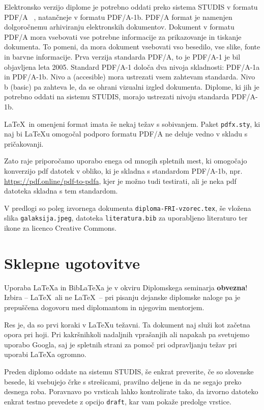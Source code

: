 \documentclass[a4paper,12pt,openright]{book}
\newcommand{\BibLaTeX}{{\sc Bib}\LaTeX}
\begin{document}
Elektronsko verzijo diplome je potrebno oddati preko sistema STUDIS v formatu PDF/A ~\cite{howtopdfa,pdfa},
natančneje v formatu PDF/A-1b. 
PDF/A format je namenjen dolgoročnemu arhiviranju elektronskih dokumentov.
Dokument v formatu PDF/A mora vsebovati vse potrebne informacije za prikazovanje in tiskanje dokumenta. To pomeni, da mora dokument  vsebovati vso besedilo, vse slike, fonte in barvne informacije.
Prva verzija standarda PDF/A, to je PDF/A-1 je bil objavljena leta 2005.
Standard PDF/A-1 določa dva nivoja skladnosti: PDF/A-1a in PDF/A-1b.
Nivo a (accesible) mora ustrezati vsem zahtevam standarda.
Nivo b (basic) pa zahteva le, da se ohrani vizualni izgled dokumenta.
Diplome, ki jih je potrebno oddati na sistemu STUDIS, morajo ustrezati nivoju standarda 
PDF/A-1b.

\LaTeX\ in omenjeni format imata še nekaj težav s sobivanjem. 
Paket \texttt{pdfx.sty}, ki naj bi \LaTeX{u} omogočal podporo formatu PDF/A ne deluje vedno
v skladu s pričakovanji. 

Zato raje priporočamo uporabo enega od mnogih spletnih mest, ki omo\-go\-ča\-jo konverzijo pdf datotek v obliko,
ki je skladna s standardom PDF/A-1b, npr. \url{https://pdf.online/pdf-to-pdfa}, kjer je
možno tudi testirati, ali je neka pdf datoteka skladna s tem standardom.

V predlogi so poleg izvornega  dokumenta \texttt{diploma-FRI-vzorec.tex}, še vložena slika \texttt{galaksija.jpeg}, datoteka \texttt{literatura.bib} za uporabljeno literaturo  ter
ikone za licenco Creative Commons.


\chapter{Sklepne ugotovitve}

Uporaba \LaTeX{a} in \BibLaTeX{a} je v okviru Diplomskega seminarja \textbf{obvezna}!
Izbira -- \LaTeX\ ali ne \LaTeX\ -- pri pisanju dejanske diplomske naloge pa je pre\-pu\-šče\-na dogovoru med diplomantom in njegovim mentorjem.

Res je, da so prvi koraki v \LaTeX{}u težavni. 
Ta dokument naj služi kot začetna opora pri hoji.
Pri kakršnihkoli nadaljnih vprašanjih ali napakah pa svetujemo uporabo Googla, saj je spletnih strani za pomoč pri odpravljanju težav pri uporabi \LaTeX{}a ogromno.

Preden diplomo oddate na sistemu STUDIS, še enkrat preverite, če so slovenske besede, ki vsebujejo črke s strešicami,  pravilno deljene in da ne segajo preko desnega roba.
Poravnavo po vrsticah lahko kontrolirate tako, da izvorno datoteko enkrat testno prevedete z opcijo \texttt{draft}, kar vam pokaže  predolge vrstice.






\printbibliography[heading=bibintoc,type=article,title={Članki v revijah}]

\printbibliography[heading=bibintoc,type=inproceedings,title={Članki v zbornikih}]

\printbibliography[heading=bibintoc,type=incollection,title={Poglavja v knjigah}]

\printbibliography[heading=bibintoc,title={Celotna literatura}]
\end{document}

